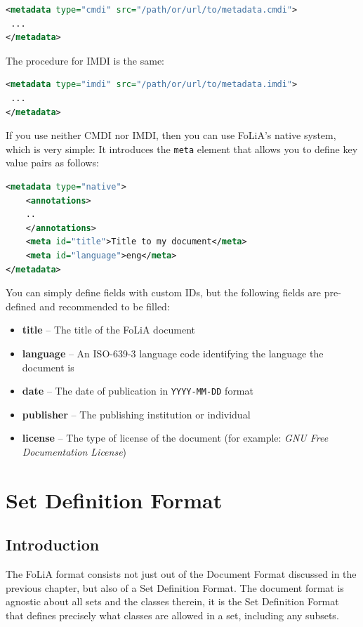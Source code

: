 \documentclass[a4paper,12pt]{report}
\begin{document}
\begin{lstlisting}[language=xml]
<metadata type="cmdi" src="/path/or/url/to/metadata.cmdi">
 ...
</metadata>
\end{lstlisting}

The procedure for IMDI is the same:

\begin{lstlisting}[language=xml]
<metadata type="imdi" src="/path/or/url/to/metadata.imdi">
 ...
</metadata>
\end{lstlisting}

If you use neither CMDI nor IMDI, then you can use FoLiA's native system, which is very simple: It introduces the \texttt{meta} element that allows you to define key value pairs as follows:

\begin{lstlisting}[language=xml]
<metadata type="native">
    <annotations>
    ..
    </annotations>
    <meta id="title">Title to my document</meta>
    <meta id="language">eng</meta>
</metadata>
\end{lstlisting}

You can simply define fields with custom IDs, but the following fields are pre-defined and recommended to be filled:

\begin{itemize}
\item \textbf{title} -- The title of the FoLiA document
\item \textbf{language} -- An ISO-639-3 language code identifying the language the document is 
\item \textbf{date} -- The date of publication in \texttt{YYYY-MM-DD} format
\item \textbf{publisher} -- The publishing institution or individual
\item \textbf{license} -- The type of license of the document (for example: \emph{GNU Free Documentation License})
\end{itemize}



\chapter{Set Definition Format}

\section{Introduction}

The FoLiA format consists not just out of the Document Format discussed in the previous chapter, but also of a Set Definition Format. The document format is agnostic about all sets and the classes therein, it is the Set Definition Format that defines precisely what classes are allowed in a set, including any subsets.
\end{document}

